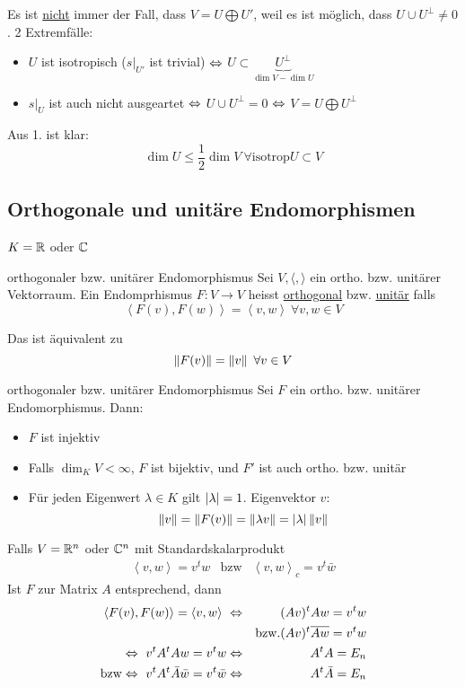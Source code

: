 \begin{Bem}
  Es ist \underline{nicht} immer der Fall, dass $V=U\bigoplus U'$, weil es ist möglich, dass $U\cup U^\perp\neq 0$. 2 Extremfälle:
  \begin{itemize}
    \item $U$ ist isotropisch ($s|_{U'}$ ist trivial) $\Leftrightarrow$ $U\subset \underbrace{U^\perp}_{\dim V-\dim U}$
    \item $s|_U$ ist auch nicht ausgeartet $\Leftrightarrow$ $U\cup U^\perp=0$ $\Leftrightarrow$ $V=U\bigoplus U^\perp$
  \end{itemize}
  Aus 1. ist klar:
  \[\dim U \leq \frac{1}{2}\dim V\ \forall \text{isotrop} U\subset V\]
\end{Bem}
\subsection{Orthogonale und unitäre Endomorphismen}
$K=\mathbb{R}$ oder $\mathbb{C}$
\begin{Def}{orthogonaler bzw. unitärer Endomorphismus}
  Sei $V, \langle, \rangle$ ein ortho. bzw. unitärer Vektorraum. Ein Endomprhismus $F:V\to V$ heisst \underline{orthogonal} bzw. \underline{unitär} falls
  \[\left\langle F(v), F(w) \right\rangle = \left\langle v, w \right\rangle\ \forall v,w\in V\]
\end{Def}
\begin{Bem}
  Das ist äquivalent zu
  \[\left\| F(v) \right\|=\left\| v \right\|\ \forall v\in V\]
\end{Bem}
\begin{Eig}{orthogonaler bzw. unitärer Endomorphismus}
  Sei $F$ ein ortho. bzw. unitärer Endomorphismus. Dann:
  \begin{itemize}
    \item $F$ ist injektiv
    \item Falls $\dim_KV<\infty$, $F$ ist bijektiv, und $F'$ ist auch ortho. bzw. unitär
    \item Für jeden Eigenwert $\lambda\in K$ gilt $\left| \lambda \right|=1$. Eigenvektor $v$:
      \[\left\| v \right\|=\left\| F(v) \right\|=\left\| \lambda v \right\|=\left| \lambda \right|\left\| v \right\|\]
  \end{itemize}
  Falls $V=\mathbb{R}^n$ oder $\mathbb{C}^n$ mit Standardskalarprodukt
  \begin{align*}
    \left\langle v,w \right\rangle = v^tw&\text{bzw}&\left\langle v,w \right\rangle_c=v^t\bar{w}    
  \end{align*}
  Ist $F$ zur Matrix $A$ entsprechend, dann
  \begin{align*}
    \left\langle F(v),F(w) \right\rangle=\left\langle v,w \right\rangle\ &\Lra& (Av)^tAw=v^tw\\
    & &\text{bzw.} (Av)^t\overline{Aw}=v^tw\\
    \Lra\ v^tA^tAw=v^tw&\Lra&A^tA=E_n\\
    \text{bzw}\Lra\ v^tA^t\bar{A}\bar{w}=v^t\bar{w}&\Lra&A^t\bar{A}=E_n
  \end{align*}
\end{Eig}
